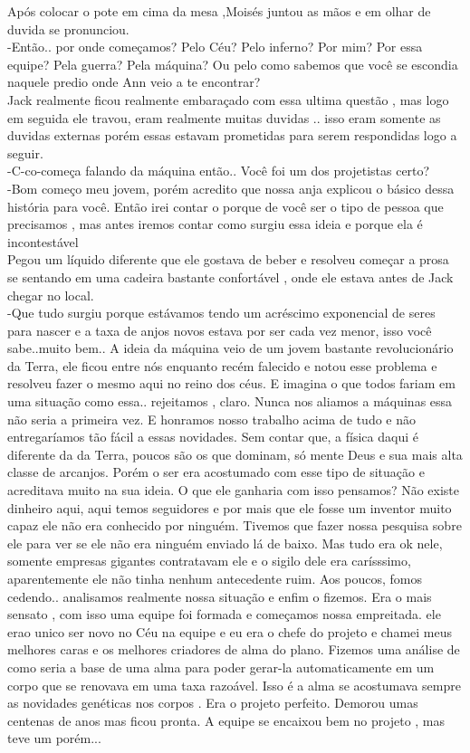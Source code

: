 \documentclass{book}
\begin{document}
 Após colocar o pote em cima da mesa ,Moisés juntou as mãos e em olhar de duvida se pronunciou.\\
 -Então.. por onde começamos? Pelo Céu? Pelo inferno? Por mim? Por essa equipe? Pela guerra? Pela máquina? Ou pelo como sabemos que você se escondia naquele predio onde Ann veio a te encontrar?\\
 Jack realmente ficou realmente embaraçado com essa ultima questão , mas logo em seguida ele travou, eram realmente muitas duvidas .. isso eram somente as duvidas externas porém essas estavam prometidas para serem respondidas logo a seguir. \\
 -C-co-começa falando da máquina então.. Você foi um dos projetistas certo?\\
 -Bom começo meu jovem, porém acredito que nossa anja explicou o básico dessa história para você. Então irei contar o porque de você ser o tipo de pessoa que precisamos , mas antes iremos contar como surgiu essa ideia e porque ela é incontestável\\
 Pegou um líquido diferente que ele gostava de beber e resolveu começar a prosa se sentando em uma cadeira bastante confortável , onde ele estava antes de Jack chegar no local.\\
 -Que tudo surgiu porque estávamos tendo um acréscimo exponencial de seres para nascer e a taxa de anjos novos estava por ser cada vez menor, isso você sabe..muito bem.. A ideia da máquina veio de um jovem bastante revolucionário da Terra, ele ficou entre nós enquanto recém falecido e notou esse problema e resolveu fazer o mesmo aqui no reino dos céus. E imagina o que todos fariam em uma situação como essa.. rejeitamos , claro. Nunca nos aliamos a máquinas essa não seria a primeira vez. E honramos nosso trabalho acima de tudo e não entregaríamos tão fácil a essas novidades. Sem contar que, a física daqui é diferente da da Terra, poucos são os que dominam, só mente Deus e sua mais alta classe de arcanjos. Porém o ser era acostumado com esse tipo de situação e acreditava muito na sua ideia. O que ele ganharia com isso pensamos? Não existe dinheiro aqui, aqui temos seguidores e por mais que ele fosse um inventor muito capaz ele não era conhecido por ninguém. Tivemos que fazer nossa pesquisa sobre ele para ver se ele não era ninguém enviado lá de baixo. Mas tudo era ok nele, somente empresas gigantes contratavam ele e o sigilo dele era carísssimo, aparentemente ele não tinha nenhum antecedente ruim. Aos poucos, fomos cedendo.. analisamos realmente nossa situação e enfim o fizemos. Era o mais sensato , com isso uma equipe foi formada e começamos nossa empreitada. ele erao unico ser novo no Céu na equipe e eu era o chefe do projeto e chamei meus melhores caras e os melhores criadores de alma do plano. Fizemos uma análise de como seria a base de uma alma para poder gerar-la automaticamente em um corpo que se renovava em uma taxa razoável. Isso é a alma se acostumava sempre as novidades genéticas nos corpos . Era o projeto perfeito. Demorou umas centenas de anos mas ficou pronta. A equipe se encaixou bem no projeto , mas teve um porém...\\
\end{document}
